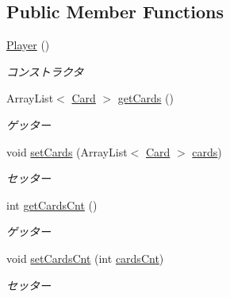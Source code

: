 \subsection*{Public Member Functions}
\begin{DoxyCompactItemize}
\item 
\hyperlink{classjp_1_1gr_1_1java__conf_1_1yuta__yoshinaga_1_1java__trumpcards_1_1_player_af0a2a1490bdad4fffb17913cf3e2082d}{Player} ()
\begin{DoxyCompactList}\small\item\em コンストラクタ \end{DoxyCompactList}\item 
Array\+List$<$ \hyperlink{classjp_1_1gr_1_1java__conf_1_1yuta__yoshinaga_1_1java__trumpcards_1_1_card}{Card} $>$ \hyperlink{classjp_1_1gr_1_1java__conf_1_1yuta__yoshinaga_1_1java__trumpcards_1_1_player_a6fa54bc94ad8959fbf76abb1107c7385}{get\+Cards} ()
\begin{DoxyCompactList}\small\item\em ゲッター \end{DoxyCompactList}\item 
void \hyperlink{classjp_1_1gr_1_1java__conf_1_1yuta__yoshinaga_1_1java__trumpcards_1_1_player_af3a6a421101b6e8ba60e9578a1b9ec74}{set\+Cards} (Array\+List$<$ \hyperlink{classjp_1_1gr_1_1java__conf_1_1yuta__yoshinaga_1_1java__trumpcards_1_1_card}{Card} $>$ \hyperlink{classjp_1_1gr_1_1java__conf_1_1yuta__yoshinaga_1_1java__trumpcards_1_1_player_a322d1b75dfc3743a73b3327924aad3c2}{cards})
\begin{DoxyCompactList}\small\item\em セッター \end{DoxyCompactList}\item 
int \hyperlink{classjp_1_1gr_1_1java__conf_1_1yuta__yoshinaga_1_1java__trumpcards_1_1_player_ae905e0de5c47509076823375e6995806}{get\+Cards\+Cnt} ()
\begin{DoxyCompactList}\small\item\em ゲッター \end{DoxyCompactList}\item 
void \hyperlink{classjp_1_1gr_1_1java__conf_1_1yuta__yoshinaga_1_1java__trumpcards_1_1_player_a658b393d95e9658b88c8aedcb44a5728}{set\+Cards\+Cnt} (int \hyperlink{classjp_1_1gr_1_1java__conf_1_1yuta__yoshinaga_1_1java__trumpcards_1_1_player_a6f2ad888db0e8899a2f15c8832433f34}{cards\+Cnt})
\begin{DoxyCompactList}\small\item\em セッター \end{DoxyCompactList}\item 

\end{DoxyCompactItemize}
